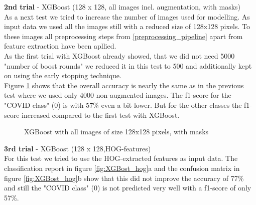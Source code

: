 \documentclass{article}
\begin{document}
\textbf{2nd trial} - XGBoost (128 x 128, all images incl. augmentation, with masks)\\
As a next test we tried to increase the number of images used for modelling. As input data we used all the images still with a reduced size of 128x128 pixels. 
To these images all preprocessing steps from \ref{preprocessing_pipeline} apart from feature extraction have been apllied.\\
As the first trial with XGBoost already showed, that we did not need 5000 "number of boost rounds" we reduced it in this test to 500 and additionally kept on 
using the early stopping technique. \\
Figure \ref{fig:XGBost_classifier_method_128_mask} shows that the overall accuracy is nearly the same as in the previous test where we used only 4000 non-augmented 
images. The f1-score for the "COVID class" (0) is with 57\% even a bit lower. But for the other classes the f1-score increased compared to the first test with XGBoost.\\

\begin{figure}[!ht]
  \centering
  \qquad
  \caption{XGBoost with all images of size 128x128 pixels, with masks}
  \label{fig:XGBost_classifier_method_128_mask}
\end{figure}

\newpage

\textbf{3rd trial} - XGBoost (128 x 128,HOG-features)\\
For this test we tried to use the HOG-extracted features as input data. The classification report in figure \ref{fig:XGBost_hog}a  and the confusion matrix
in figure \ref{fig:XGBost_hog}b show that this did not improve the accuracy of 77\% and still the "COVID class" (0) is not predicted very well with a f1-score of
only 57\%.
\end{document}
